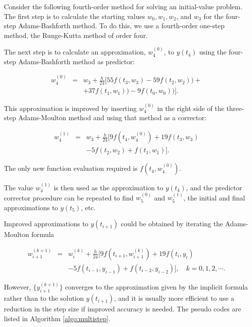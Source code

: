 \documentclass[preprint,12pt]{elsarticle}
\begin{document}
Consider the following fourth-order method for solving an initial-value problem. The first step is to calculate the starting values $w_0, w_1, w_2$, and $w_3$ for the four-step Adams-Bashforth method. To do this, we use a fourth-order one-step method, the Runge-Kutta method of order four.

The next step is to calculate an approximation, $w_4^{(0)}$, to $y(t_4)$ using the four-step Adams-Bashforth method as predictor:

\begin{eqnarray*}
  w^{(0)}_{4} &=& w_3+\frac{h}{24}[55f(t_{3},w_{3})-59f(t_{2},w_{2}))+\nonumber \\
   && +37f(t_{1},w_{1}))-9f(t_{0},w_{0}))].
\end{eqnarray*}

This approximation is improved by inserting $w^{(0)}_4$ in the right side of the three-step Adams-Moulton method and using that method as a corrector:

\begin{eqnarray*}
  w_4^{(1)} &=& w_3+\frac{h}{24}[9f(t_4,w_4^{(0)})+ 19f(t_3,w_3)\nonumber \\
  &&-5f(t_2,w_2)+f(t_1,w_1)].
\end{eqnarray*}

The only new function evaluation required is $f(t_4,w_4^{(0)})$.

The value $ w_4^{(1)}$ is then used as the approximation to $y(t_4)$, and the predictor corrector procedure can be repeated to find $w_5^{(0)}$ and $w_5^{(1)}$, the initial and final approximations to $y(t_5)$, etc.

Improved approximations to $y(t_{i+1})$ could be obtained by iterating the Adams-Moulton formula

\begin{eqnarray*}
  w_{i+1}^{(k+1)} &=& w_i^{(k)}+\frac{h}{24}[9f(t_{i+1},w_{i+1}^{(k)})+ 19f(t_{i},y_{i})\nonumber \\
  &&-5f(t_{i-1},y_{i-1})+f(t_{i-2},y_{i-2})],\quad k=0,1,2,\cdots.
\end{eqnarray*}

However, $\{y_{i+1}^{(k+1)}\}$ converges to the approximation given by the implicit formula rather than to the solution $y(t_{i+1})$, and it is usually more efficient to use a reduction in the step size if improved accuracy is needed. The pseudo codes are listed in Algorithm \ref{algo:multistep}.
\end{document}
